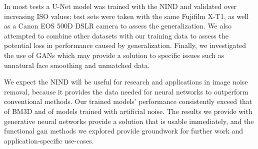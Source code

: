 In most tests a U-Net model was trained with the \ac{NIND} and validated over increasing ISO values; test sets were taken with the same Fujifilm X-T1, as well as a Canon EOS 500D DSLR camera to assess the generalization. We also attempted to combine other datasets with our training data to assess the potential loss in performance caused by generalization. %
Finally, we investigated the use of \aclp{GAN} \cite{pix2pix} which may provide a solution to specific issues such as unnatural face smoothing and unmatched data.

We expect the \acl{NIND} will be useful for research and applications in image noise removal, because it provides the data needed for neural networks to outperform conventional methods. Our trained models' performance consistently exceed that of \ac{BM3D} and of models trained with artificial noise. The results we provide with generative neural networks provide a solution that is usable immediately, and the functional \acl{gan} methods we explored provide groundwork for further work and application-specific use-cases.



